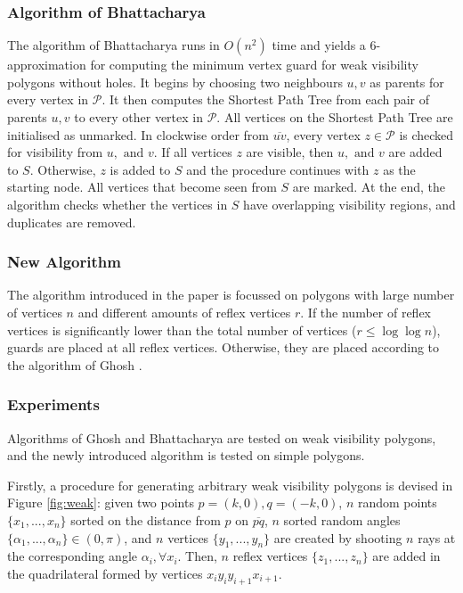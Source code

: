 \subsubsection{Algorithm of Bhattacharya \cite{bhattacharya2016approximability}}
The algorithm of Bhattacharya \cite{bhattacharya2016approximability} runs in $O(n^2)$ time and yields a 6-approximation for computing the minimum vertex guard for weak visibility polygons without holes. It begins by choosing two neighbours $u, v$ as parents for every vertex in $\mathcal P$. It then computes the Shortest Path Tree from each pair of parents $u, v$ to every other vertex in $\mathcal P$. All vertices on the Shortest Path Tree are initialised as unmarked. In clockwise order from $\overline{uv}$, every vertex $z \in \mathcal P$ is checked for visibility from $u, \text{ and } v$. If all vertices $z$ are visible, then $u, \text{ and }v$ are added to $S$. Otherwise, $z$ is added to $S$ and the procedure continues with $z$ as the starting node. All vertices that become seen from $S$ are marked. At the end, the algorithm checks whether the vertices in $S$ have overlapping visibility regions, and duplicates are removed.

\subsubsection{New Algorithm}
The algorithm introduced in the paper is focussed on polygons with large number of vertices $n$ and different amounts of reflex vertices $r$. If the number of reflex vertices is significantly lower than the total number of vertices ($r \leq \log \log n$), guards are placed at all reflex vertices. Otherwise, they are placed according to the algorithm of Ghosh \cite{GHOSH2010718}.

\subsubsection{Experiments}
Algorithms of Ghosh \cite{GHOSH2010718} and Bhattacharya \cite{bhattacharya2016approximability} are tested on weak visibility polygons, and the newly introduced algorithm is tested on simple polygons. 

Firstly, a procedure for generating arbitrary weak visibility polygons is devised in Figure \ref{fig:weak}: given two points $p = (k, 0), q = (-k, 0)$,  $n$ random points $\{x_1, ..., x_n\}$ sorted on the distance from $p$ on $\overline{pq}$, $n$ sorted random angles $\{\alpha_1, ..., \alpha_n\} \in  (0, \pi)$, and $n$ vertices $\{y_1, ..., y_n\}$ are created by shooting $n$ rays at the corresponding angle $\alpha_i, \forall x_i$. Then, $n$ reflex vertices $\{z_1, ..., z_n\}$ are added in the quadrilateral formed by vertices $x_iy_iy_{i + 1}x_{i + 1}$.

